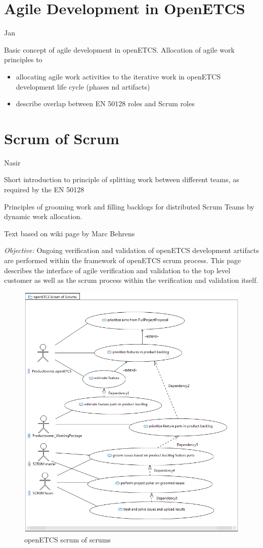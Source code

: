 \documentclass{template/openetcs_report}
\begin{document}
\chapter{Agile Development in OpenETCS}
\label{sec:agile}

Jan

Basic concept of agile development in openETCS.
Allocation of agile work principles to 

\begin{itemize}
\item allocating agile work activities to the iterative work in openETCS development life cycle (phases nd artifacts) 
\item describe overlap between EN 50128 roles and Scrum roles
\end{itemize}


\chapter{Scrum of Scrum}
\label{sec:Scrumofscrum}

Nasir

Short introduction to principle of splitting work between different teams, as required by the EN 50128

Principles of grooming work and filling backlogs for distributed Scrum Teams by dynamic work allocation.

Text based on wiki page by Marc Behrens

\textit{Objective:} Ongoing verification and validation of openETCS development artifacts are performed within the framework of openETCS scrum process. This page describes the interface of agile verification and validation to the top level customer as well as the scrum process within the verification and validation itself.

\begin{figure}[h]
\centering
\includegraphics[width=0.7\linewidth]{./images/openETCSVnVScrumOfScrum_02}
\caption{openETCS scrum of scrums}
\label{fig:openETCSVnVScrumOfScrum}
\end{figure}
\end{document}
